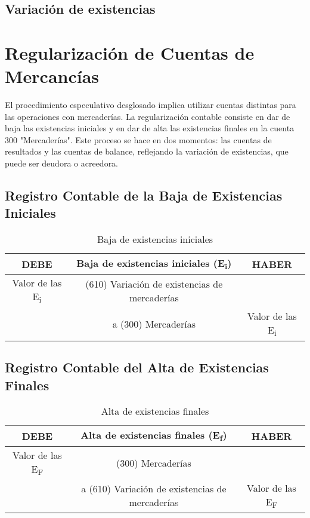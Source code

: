 \documentclass{article}
\begin{document}
\subsection{Variación de existencias}


\section*{Regularización de Cuentas de Mercancías}

El procedimiento especulativo desglosado implica utilizar cuentas distintas para las operaciones con mercaderías. La regularización contable consiste en dar de baja las existencias iniciales y en dar de alta las existencias finales en la cuenta 300 "Mercaderías". Este proceso se hace en dos momentos: las cuentas de resultados y las cuentas de balance, reflejando la variación de existencias, que puede ser deudora o acreedora.

\subsection*{Registro Contable de la Baja de Existencias Iniciales}
\begin{table}[h]
\centering
\begin{tabular}{|c|c|c|}
\hline
\textbf{DEBE} & \textbf{Baja de existencias iniciales (E\textsubscript{i})} & \textbf{HABER} \\
\hline
Valor de las E\textsubscript{i} & (610) Variación de existencias de mercaderías & \\
\hline
& a (300) Mercaderías & Valor de las E\textsubscript{i}\\
\hline
\end{tabular}
\caption{Baja de existencias iniciales}
\end{table}

\subsection*{Registro Contable del Alta de Existencias Finales}
\begin{table}[h]
\centering
\begin{tabular}{|c|c|c|}
\hline
\textbf{DEBE} & \textbf{Alta de existencias finales (E\textsubscript{f})} & \textbf{HABER} \\
\hline
Valor de las E\textsubscript{F} & (300) Mercaderías & \\ 
\hline
 & a (610) Variación de existencias de mercaderías & Valor de las E\textsubscript{F} \\
\hline
\end{tabular}
\caption{Alta de existencias finales}
\end{table}
\end{document}
